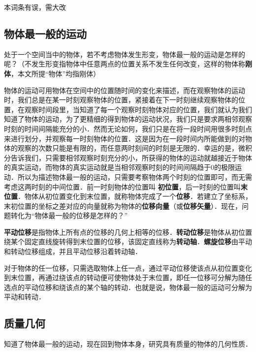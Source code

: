 
\begin{issues}
本词条有误，需大改
\end{issues}
\subsection{物体最一般的运动}
处于一个空间当中的物体，若不考虑物体发生形变，物体最一般的运动是怎样的呢？（不发生形变指物体中任意两点的位置关系不发生任何改变，这样的物体称\textbf{刚体}，本文所提“物体”均指刚体）

物体的运动可用物体在空间中的位置随时间的变化来描述，而在观察物体的运动时，我们总是在某一时刻观察物体的位置，紧接着在下一时刻继续观察物体的位置，在观察时间段里，当知道了每一个观察时刻物体对应的位置，我们就认为我们知道了物体的运动，为了更精细的得到物体的运动状况，我们只是要求两相邻观察时刻的时间间隔能充分的小．然而无论如何，我们只是在将一段时间用很多时刻点来进行划分，并观察每一时刻物体的位置．这是因为在一段时间内所能做到的对物体的观察的次数只能是有限的，而任意两时刻间的时刻是无限的．幸运的是，微积分告诉我们，只需要相邻观察时刻充分的小，所获得的物体的运动就越接近于物体的真实运动，而物体的真实运动就是当相邻观察时刻的时间间隔趋于0的极限运动．所以为描述物体最一般的运动，只需要考察物体两个时刻的位置即可，而无需考虑这两时刻的中间位置．前一时刻物体的位置叫 \textbf{初位置}，后一时刻的位置叫\textbf{末位置}．物体从初位置变化到末位置，就称物体完成了一个\textbf{位移}．若建立了坐标系，末初位置的坐标之差对应的向量就称为物体的\textbf{位移向量}（或\textbf{位移矢量}）．现在，问题转化为“物体最一般的位移是怎样的？”

\textbf{平动位移}是指物体上所有点的位移的几何上相等的位移．\textbf{转动位移}是物体从初位置绕某个固定直线旋转得到末位置的位移，该固定直线称为\textbf{转动轴}．\textbf{螺旋位移}由平动和转动位移组成，并且平动位移沿着转动轴．

对于物体的任一位移，只需选取物体上任一点，通过平动位移使该点从初位置变化到末位置，再通过绕该点的转动便可使物体处于末位置，即任一位移可分解为随任选点的平动位移和绕该点的某个轴的转动．也就是说，物体最一般的运动可分解为平动和转动．
\subsection{质量几何}
知道了物体最一般的运动，现在回到物体本身，研究具有质量的物体的几何性质．
